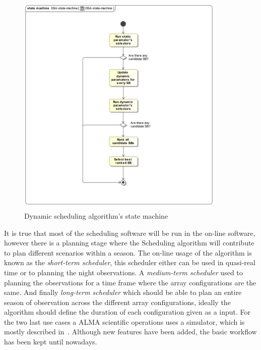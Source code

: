 \begin{figure}[htbp]	
\begin{center}
\includegraphics[width=0.9\textwidth]{images/DSA-state-machine}
\end{center}
\caption{Dynamic scheduling algorithm's state machine}
\label{fig:sched-dsa-state-machine}
\end{figure}

It is true that most of the scheduling software will be run in the on-line software, however there is a planning stage where the Scheduling algorithm will contribute to plan different scenarios within a season. The on-line usage of the algorithm is known as the \textit{short-term scheduler}, this scheduler either can be used in quasi-real time or to planning the night observations. A \textit{medium-term scheduler} used to planning the observations for a time frame where the array configurations are the same. And finally \textit{long-term scheduler} which should be able to plan an entire season of observation across the different array configurations, ideally the algorithm should define the duration of each configuration given as a input. For the two last use cases a ALMA scientific operations uses a simulator, which is mostly described in~\cite{hoffstadt10}. Although new features have been added, the basic workflow has been kept until nowadays.